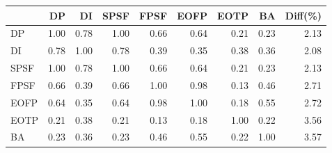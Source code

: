 \begin{tabular}{l|rrrrrrr|r}
\toprule
 & DP & DI & SPSF & FPSF & EOFP & EOTP & BA & Diff(\%)  \\
\midrule
DP & 1.00 & 0.78 & 1.00 & 0.66 & 0.64 & 0.21 & 0.23 & 2.13  \\
DI & 0.78 & 1.00 & 0.78 & 0.39 & 0.35 & 0.38 & 0.36 & 2.08  \\
SPSF & 1.00 & 0.78 & 1.00 & 0.66 & 0.64 & 0.21 & 0.23 & 2.13  \\
FPSF & 0.66 & 0.39 & 0.66 & 1.00 & 0.98 & 0.13 & 0.46 & 2.71  \\
EOFP & 0.64 & 0.35 & 0.64 & 0.98 & 1.00 & 0.18 & 0.55 & 2.72  \\
EOTP & 0.21 & 0.38 & 0.21 & 0.13 & 0.18 & 1.00 & 0.22 & 3.56  \\
BA & 0.23 & 0.36 & 0.23 & 0.46 & 0.55 & 0.22 & 1.00 & 3.57  \\
\bottomrule
\end{tabular}

